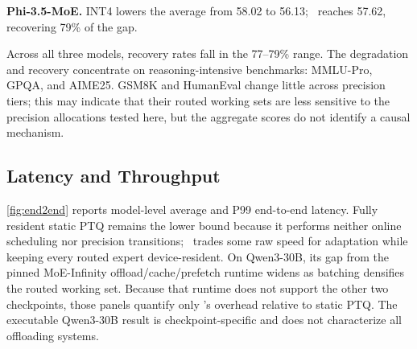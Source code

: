 \textbf{Phi-3.5-MoE.} INT4 lowers the average from 58.02 to 56.13; \systemname\ reaches 57.62, recovering 79\% of the gap.

Across all three models, recovery rates fall in the 77--79\% range. The degradation and recovery concentrate on reasoning-intensive benchmarks: MMLU-Pro, GPQA, and AIME25. GSM8K and HumanEval change little across precision tiers; this may indicate that their routed working sets are less sensitive to the precision allocations tested here, but the aggregate scores do not identify a causal mechanism.

\subsection{Latency and Throughput}
\label{sec:eval-performance}

\autoref{fig:end2end} reports model-level average and P99 end-to-end latency. Fully resident static PTQ remains the lower bound because it performs neither online scheduling nor precision transitions; \systemname\ trades some raw speed for adaptation while keeping every routed expert device-resident. On Qwen3-30B, its gap from the pinned MoE-Infinity offload/cache/prefetch runtime widens as batching densifies the routed working set. Because that runtime does not support the other two checkpoints, those panels quantify only \systemname's overhead relative to static PTQ. The executable Qwen3-30B result is checkpoint-specific and does not characterize all offloading systems.

